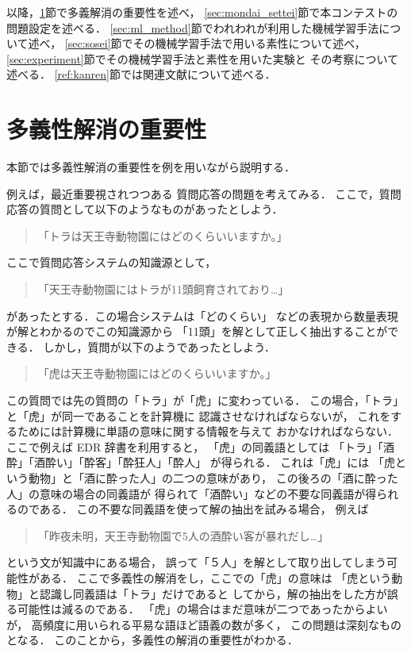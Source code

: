 以降，\ref{sec:imp}節で多義解消の重要性を述べ，
\ref{sec:mondai_settei}節で本コンテストの問題設定を述べる．
\ref{sec:ml_method}節でわれわれが利用した機械学習手法について述べ，
\ref{sec:sosei}節でその機械学習手法で用いる素性について述べ，
\ref{sec:experiment}節でその機械学習手法と素性を用いた実験と
その考察について述べる．
\ref{ref:kanren}節では関連文献について述べる．

\section{多義性解消の重要性}
\label{sec:imp}

本節では多義性解消の重要性を例を用いながら説明する．

例えば，最近重要視されつつある
質問応答\cite{murata2000_1_nl,qac_hp}の問題を考えてみる．
ここで，質問応答の質問として以下のようなものがあったとしよう．
\begin{quote}
  「トラは天王寺動物園にはどのくらいいますか。」
\end{quote}
ここで質問応答システムの知識源として，
\begin{quote}
  「天王寺動物園にはトラが11頭飼育されており…」
\end{quote}
があったとする．この場合システムは「どのくらい」
などの表現から数量表現が解とわかるのでこの知識源から
「11頭」を解として正しく抽出することができる．
しかし，質問が以下のようであったとしよう．
\begin{quote}
  「虎は天王寺動物園にはどのくらいいますか。」
\end{quote}
この質問では先の質問の「トラ」が「虎」に変わっている．
この場合，「トラ」と「虎」が同一であることを計算機に
認識させなければならないが，
これをするためには計算機に単語の意味に関する情報を与えて
おかなければならない．
ここで例えば EDR 辞書\cite{edr}を利用すると，
「虎」の同義語としては
「トラ」「酒酔」「酒酔い」「酔客」「酔狂人」「酔人」
が得られる．
これは「虎」には
「虎という動物」と「酒に酔った人」の二つの意味があり，
この後ろの「酒に酔った人」の意味の場合の同義語が
得られて「酒酔い」などの不要な同義語が得られるのである．
この不要な同義語を使って解の抽出を試みる場合，
例えば
\begin{quote}
  \mbox{「昨夜未明，天王寺動物園で5人の酒酔い客が暴れだし…」}
\end{quote}
という文が知識中にある場合，
誤って「５人」を解として取り出してしまう可能性がある．
ここで多義性の解消をし，ここでの「虎」の意味は
「虎という動物」と認識し同義語は「トラ」だけであると
してから，解の抽出をした方が誤る可能性は減るのである．
「虎」の場合はまだ意味が二つであったからよいが，
高頻度に用いられる平易な語ほど語義の数が多く，
この問題は深刻なものとなる．
このことから，多義性の解消の重要性がわかる．

